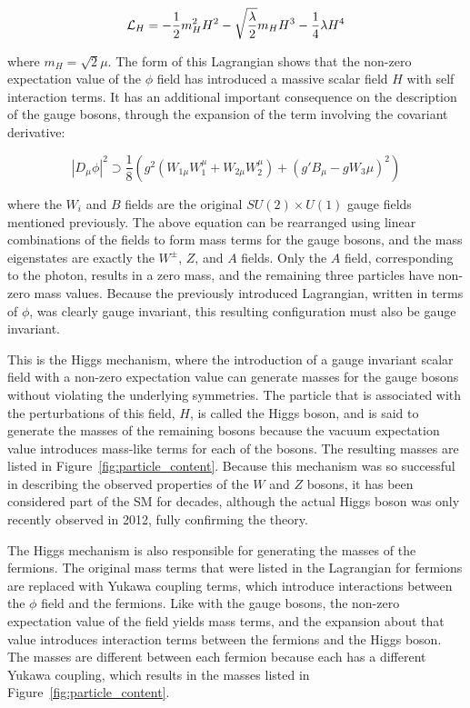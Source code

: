 \begin{equation}
  \mathcal{L}_{H} = -\frac{1}{2}m_H^2 H^2 - \sqrt{\frac{\lambda}{2}}m_H H^3 - \frac{1}{4}\lambda H^4
\end{equation}

\noindent where $m_H = \sqrt{2}\mu$.
The form of this Lagrangian shows that the non-zero expectation value of the $\phi$ field has introduced a massive scalar field $H$ with self interaction terms.
It has an additional important consequence on the description of the gauge bosons, through the expansion of the term involving the covariant derivative:

\begin{equation}
  |D_\mu\phi|^2 \supset \frac{1}{8}\left(g^2(W_{1\mu}W_1^\mu + W_{2\mu}W_2^\mu) + (g'B_\mu - gW_3{\mu})^2\right)
\end{equation}

where the $W_i$ and $B$ fields are the original $SU(2)\times U(1)$ gauge fields mentioned previously.
The above equation can be rearranged using linear combinations of the fields to form mass terms for the gauge bosons, and the mass eigenstates are exactly the $W^\pm$, $Z$, and $A$ fields.
Only the $A$ field, corresponding to the photon, results in a zero mass, and the remaining three particles have non-zero mass values.
Because the previously introduced Lagrangian, written in terms of $\phi$, was clearly gauge invariant, this resulting configuration must also be gauge invariant.

This is the Higgs mechanism, where the introduction of a gauge invariant scalar field with a non-zero expectation value can generate masses for the gauge bosons without violating the underlying symmetries.
The particle that is associated with the perturbations of this field, $H$, is called the Higgs boson, and is said to generate the masses of the remaining bosons because the vacuum expectation value introduces mass-like terms for each of the bosons.
The resulting masses are listed in Figure~\ref{fig:particle_content}.
Because this mechanism was so successful in describing the observed properties of the $W$ and $Z$ bosons, it has been considered part of the \ac{SM} for decades, although the actual Higgs boson was only recently observed in 2012, fully confirming the theory.

The Higgs mechanism is also responsible for generating the masses of the fermions.
The original mass terms that were listed in the Lagrangian for fermions are replaced with Yukawa coupling terms, which introduce interactions between the $\phi$ field and the fermions.
Like with the gauge bosons, the non-zero expectation value of the field yields mass terms, and the expansion about that value introduces interaction terms between the fermions and the Higgs boson.
The masses are different between each fermion because each has a different Yukawa coupling, which results in the masses listed in Figure~\ref{fig:particle_content}.


